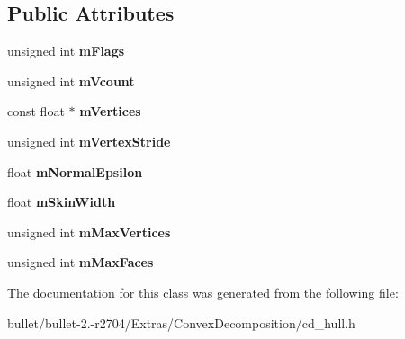 \subsection*{Public Attributes}
\begin{DoxyCompactItemize}
\item 
\hypertarget{class_convex_decomposition_1_1_hull_desc_a1b98bcbe15352ece85b4ab7c059a906c}{unsigned int {\bfseries m\+Flags}}\label{class_convex_decomposition_1_1_hull_desc_a1b98bcbe15352ece85b4ab7c059a906c}

\item 
\hypertarget{class_convex_decomposition_1_1_hull_desc_a9a02469b281078a82d39974e2a04bee6}{unsigned int {\bfseries m\+Vcount}}\label{class_convex_decomposition_1_1_hull_desc_a9a02469b281078a82d39974e2a04bee6}

\item 
\hypertarget{class_convex_decomposition_1_1_hull_desc_a7edde21805dc508f63ee4ec41a0f7766}{const float $\ast$ {\bfseries m\+Vertices}}\label{class_convex_decomposition_1_1_hull_desc_a7edde21805dc508f63ee4ec41a0f7766}

\item 
\hypertarget{class_convex_decomposition_1_1_hull_desc_a0134506e8977cb4083a8ce8057281ede}{unsigned int {\bfseries m\+Vertex\+Stride}}\label{class_convex_decomposition_1_1_hull_desc_a0134506e8977cb4083a8ce8057281ede}

\item 
\hypertarget{class_convex_decomposition_1_1_hull_desc_a912162e4216d310a45e84a2110006a59}{float {\bfseries m\+Normal\+Epsilon}}\label{class_convex_decomposition_1_1_hull_desc_a912162e4216d310a45e84a2110006a59}

\item 
\hypertarget{class_convex_decomposition_1_1_hull_desc_acb5349d95584b0d881eea2a7368b6ec9}{float {\bfseries m\+Skin\+Width}}\label{class_convex_decomposition_1_1_hull_desc_acb5349d95584b0d881eea2a7368b6ec9}

\item 
\hypertarget{class_convex_decomposition_1_1_hull_desc_a625ba2c77e791fb303f8952b080edc6f}{unsigned int {\bfseries m\+Max\+Vertices}}\label{class_convex_decomposition_1_1_hull_desc_a625ba2c77e791fb303f8952b080edc6f}

\item 
\hypertarget{class_convex_decomposition_1_1_hull_desc_a67616b9fbc5d6198f8863efdf91e37e9}{unsigned int {\bfseries m\+Max\+Faces}}\label{class_convex_decomposition_1_1_hull_desc_a67616b9fbc5d6198f8863efdf91e37e9}

\end{DoxyCompactItemize}


The documentation for this class was generated from the following file\+:\begin{DoxyCompactItemize}
\item 
bullet/bullet-\/2.-\/r2704/\+Extras/\+Convex\+Decomposition/cd\+\_\+hull.\+h\end{DoxyCompactItemize}
